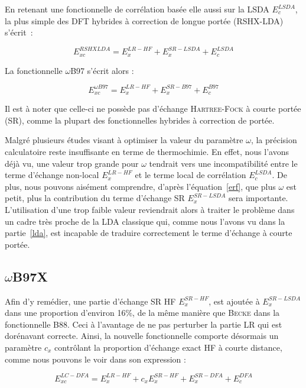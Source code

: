 {{En retenant une fonctionnelle de corrélation basée elle aussi sur la LSDA $E_{c}^{LSDA}$, la plus simple des DFT hybrides à correction de longue portée (RSHX-LDA) s'écrit~:

\begin{equation}
E_{xc}^{RSHXLDA} = E_{x}^{LR-HF} + E_{x}^{SR-LSDA} + E_{c}^{LSDA}
\end{equation}

La fonctionnelle $\omega$B97\cite{chai2008long} s'écrit alors :

\begin{equation}
E_{xc}^{\omega B97} = E_{x}^{LR-HF} + E_{x}^{SR-B97} + E_{c}^{B97}
\end{equation}

Il est à noter que celle-ci ne possède pas d'échange \textsc{Hartree-Fock} à courte portée (SR), comme la plupart des fonctionnelles hybrides à correction de portée.

Malgré plusieurs études visant à optimiser la valeur du paramètre $\omega$, la précision calculatoire reste insuffisante en terme de thermochimie. En effet, nous l'avons déjà vu, une valeur trop grande pour $\omega$ tendrait vers une incompatibilité entre le terme d'échange non-local $E_{x}^{LR-HF}$ et le terme local de corrélation $E_{c}^{LSDA}$. De plus, nous pouvons aisément comprendre, d'après l'équation~\ref{erf}, que plus $\omega$ est petit, plus la contribution du terme d'échange SR $E_{x}^{SR-LSDA}$ sera importante. L'utilisation d'une trop faible valeur  reviendrait alors à traiter le problème dans un cadre très proche de la LDA classique qui, comme nous l'avons vu dans la partie~\ref{lda}, est incapable de traduire correctement le terme d'échange à courte portée.

\subsection{$\omega$B97X}

Afin d'y remédier, une partie d'échange SR HF $E_{x}^{SR-HF}$, est ajoutée à $E_{x}^{SR-LSDA}$ dans une proportion d'environ 16\%,  de la même manière que \textsc{Becke} dans la fonctionnelle B88. Ceci à l'avantage de ne pas perturber la partie LR qui est dorénavant correcte. Ainsi, la nouvelle fonctionnelle comporte désormais un paramètre $c_{x}$ contrôlant la proportion d'échange exact HF à courte distance, comme nous pouvons le voir dans son expression :

\begin{equation}
E_{xc}^{LC-DFA} = E_{x}^{LR-HF} + c_{x}E_{x}^{SR-HF} + E_{x}^{SR-DFA} + E_{c}^{DFA}
\end{equation}

}}
